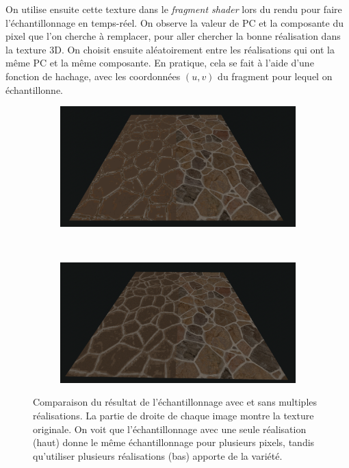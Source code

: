 On utilise ensuite cette texture dans le \textit{fragment shader} lors du rendu pour faire l'échantillonnage en temps-réel. On observe la valeur de PC et la composante du pixel que l'on cherche à remplacer, pour aller chercher la bonne réalisation dans la texture 3D. On choisit ensuite aléatoirement entre les réalisations qui ont la même PC et la même composante. En pratique, cela se fait à l'aide d'une fonction de hachage, avec les coordonnées $(u, v)$ du fragment pour lequel on échantillonne.

\bigskip

\begin{figure}
    \centering
    \begin{subfigure}{.95\textwidth}
        \centering
        \includegraphics[width=\textwidth]{contenu/resources/images/partitioned_sampling_pc_preserving_no_shuffle}
    \end{subfigure}
    \\
    \begin{subfigure}{.95\textwidth}
        \centering
        \includegraphics[width=\textwidth]{contenu/resources/images/partitioned_sampling_pc_preserving_shuffle_uv}
    \end{subfigure}
    \caption[Échantillonnage avec et sans multiples réalisations]{Comparaison du résultat de l'échantillonnage avec et sans multiples réalisations. La partie de droite de chaque image montre la texture originale. On voit que l'échantillonnage avec une seule réalisation (haut) donne le même échantillonnage pour plusieurs pixels, tandis qu'utiliser plusieurs réalisations (bas) apporte de la variété.}
    \label{fig:offset-shuffle}
\end{figure}


